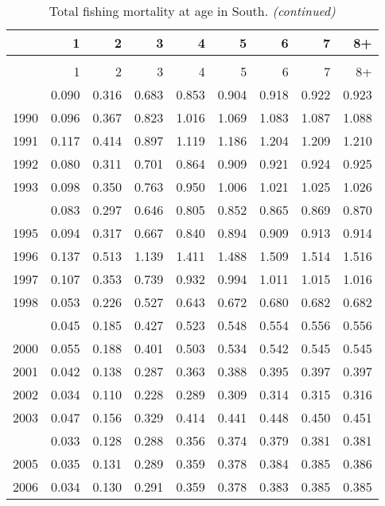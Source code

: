 \documentclass[
]{article}
\begin{document}
\begin{longtable}[t]{lrrrrrrrr}
\caption{\label{tab:South-region-FAA-table}Total fishing mortality at age in South.}\\
\toprule
  & 1 & 2 & 3 & 4 & 5 & 6 & 7 & 8+\\
\midrule
\endfirsthead
\caption[]{Total fishing mortality at age in South. \textit{(continued)}}\\
\toprule
  & 1 & 2 & 3 & 4 & 5 & 6 & 7 & 8+\\
\midrule
\endhead

\endfoot
\bottomrule
\endlastfoot
1989 & 0.090 & 0.316 & 0.683 & 0.853 & 0.904 & 0.918 & 0.922 & 0.923\\
1990 & 0.096 & 0.367 & 0.823 & 1.016 & 1.069 & 1.083 & 1.087 & 1.088\\
1991 & 0.117 & 0.414 & 0.897 & 1.119 & 1.186 & 1.204 & 1.209 & 1.210\\
1992 & 0.080 & 0.311 & 0.701 & 0.864 & 0.909 & 0.921 & 0.924 & 0.925\\
1993 & 0.098 & 0.350 & 0.763 & 0.950 & 1.006 & 1.021 & 1.025 & 1.026\\
\addlinespace
1994 & 0.083 & 0.297 & 0.646 & 0.805 & 0.852 & 0.865 & 0.869 & 0.870\\
1995 & 0.094 & 0.317 & 0.667 & 0.840 & 0.894 & 0.909 & 0.913 & 0.914\\
1996 & 0.137 & 0.513 & 1.139 & 1.411 & 1.488 & 1.509 & 1.514 & 1.516\\
1997 & 0.107 & 0.353 & 0.739 & 0.932 & 0.994 & 1.011 & 1.015 & 1.016\\
1998 & 0.053 & 0.226 & 0.527 & 0.643 & 0.672 & 0.680 & 0.682 & 0.682\\
\addlinespace
1999 & 0.045 & 0.185 & 0.427 & 0.523 & 0.548 & 0.554 & 0.556 & 0.556\\
2000 & 0.055 & 0.188 & 0.401 & 0.503 & 0.534 & 0.542 & 0.545 & 0.545\\
2001 & 0.042 & 0.138 & 0.287 & 0.363 & 0.388 & 0.395 & 0.397 & 0.397\\
2002 & 0.034 & 0.110 & 0.228 & 0.289 & 0.309 & 0.314 & 0.315 & 0.316\\
2003 & 0.047 & 0.156 & 0.329 & 0.414 & 0.441 & 0.448 & 0.450 & 0.451\\
\addlinespace
2004 & 0.033 & 0.128 & 0.288 & 0.356 & 0.374 & 0.379 & 0.381 & 0.381\\
2005 & 0.035 & 0.131 & 0.289 & 0.359 & 0.378 & 0.384 & 0.385 & 0.386\\
2006 & 0.034 & 0.130 & 0.291 & 0.359 & 0.378 & 0.383 & 0.385 & 0.385\\

\end{longtable}
\end{document}
